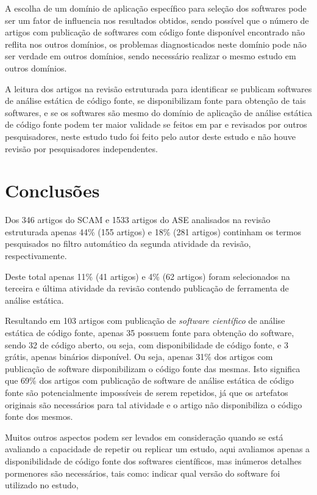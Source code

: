 A escolha de um domínio de aplicação específico para seleção dos softwares
pode ser um fator de influencia nos resultados obtidos, sendo possível que
o número de artigos com publicação de softwares com código fonte disponível
encontrado não reflita nos outros domínios, os problemas diagnosticados
neste domínio pode não ser verdade em outros domínios, sendo necessário
realizar o mesmo estudo em outros domínios.

A leitura dos artigos na revisão estruturada para identificar se publicam
softwares de análise estática de código fonte, se disponibilizam fonte para
obtenção de tais softwares, e se os softwares são mesmo do domínio de aplicação
de análise estática de código fonte podem ter maior validade se feitos em
par e revisados por outros pesquisadores, neste estudo tudo foi feito pelo
autor deste estudo e não houve revisão por pesquisadores independentes.

\section{Conclusões}

Dos 346 artigos do SCAM e 1533 artigos do ASE analisados na revisão estruturada
apenas 44\% (155 artigos) e 18\% (281 artigos) continham os termos pesquisados
no filtro automático da segunda atividade da revisão, respectivamente.

Deste total apenas 11\% (41 artigos) e 4\% (62 artigos) foram selecionados na
terceira e última atividade da revisão contendo publicação de ferramenta de
análise estática.

Resultando em 103 artigos com publicação de {\it software científico} de
análise estática de código fonte, apenas 35 possuem fonte para obtenção do
software, sendo 32 de código aberto, ou seja, com disponibilidade de
código fonte, e 3 grátis, apenas binários disponível. Ou seja, apenas 31\% dos
artigos com publicação de software disponibilizam o código fonte das mesmas.
Isto significa que 69\% dos artigos com publicação de software de análise
estática de código fonte são potencialmente impossíveis de serem repetidos, já
que os artefatos originais são necessários para tal atividade e o artigo não
disponibiliza o código fonte dos mesmos.


Muitos outros aspectos podem ser levados em consideração quando se está
avaliando a capacidade de repetir ou replicar um estudo, aqui avaliamos apenas
a disponibilidade de código fonte dos softwares científicos, mas inúmeros detalhes
pormenores são necessários, tais como: indicar qual versão do software foi
utilizado no estudo, 

